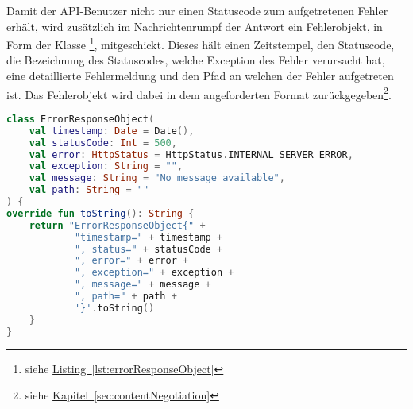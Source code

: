 Damit der \gls{API}-Benutzer nicht nur einen Statuscode zum aufgetretenen Fehler erhält, wird zusätzlich im Nachrichtenrumpf der Antwort ein Fehlerobjekt, in Form der Klasse \footnote{siehe \hyperref[lst:errorResponseObject]{Listing~\ref{lst:errorResponseObject}}}, mitgeschickt. Dieses hält einen Zeitstempel, den Statuscode, die Bezeichnung des Statuscodes, welche Exception des Fehler verursacht hat, eine detaillierte Fehlermeldung und den Pfad an welchen der Fehler aufgetreten ist. Das Fehlerobjekt wird dabei in dem angeforderten Format zurückgegeben\footnote{siehe \hyperref[sec:contentNegotiation]{Kapitel~\ref{sec:contentNegotiation}}}.
\begin{lstlisting}[style=lstStyleFramed, language=Kotlin, caption={Spring-Konfiguration des Exceptionhandling}, label=lst:errorResponseObject, float]
class ErrorResponseObject(
	val timestamp: Date = Date(),
	val statusCode: Int = 500,
	val error: HttpStatus = HttpStatus.INTERNAL_SERVER_ERROR,
	val exception: String = "",
	val message: String = "No message available",
	val path: String = ""
) {
override fun toString(): String {
	return "ErrorResponseObject{" +
			"timestamp=" + timestamp +
			", status=" + statusCode +
			", error=" + error +
			", exception=" + exception +
			", message=" + message +
			", path=" + path +
			'}'.toString()
	}
}
\end{lstlisting}

